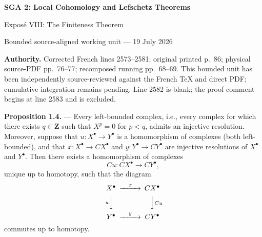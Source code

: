 \documentclass[10pt,a4paper]{article}
\newcommand{\ZZ}{\mathbf Z}
\begin{document}
\begin{center}
  {\Large\bfseries SGA 2: Local Cohomology and Lefschetz Theorems}\par\smallskip
  {\large Expos\'e VIII: The Finiteness Theorem}\par
  \small Bounded source-aligned working unit --- 19 July 2026
\end{center}
\noindent\colorbox{softgray}{\parbox{0.95\linewidth}{\footnotesize\textbf{Authority.}
Corrected French lines 2573--2581; original printed p.~86; physical
source-PDF pp.~76--77; recomposed running pp.~68--69. This bounded unit has
been independently source-reviewed against the French TeX and direct PDF;
cumulative integration remains pending. Line 2582 is blank; the proof comment
begins at line 2583 and is excluded.}}

\noindent\textbf{Proposition 1.4.} --- Every left-bounded complex, i.e., every
complex for which there exists $q\in\ZZ$ such that $X^p=0$ for $p<q$, admits
an injective resolution. Moreover, suppose that
$u\colon X^\bullet\longrightarrow Y^\bullet$ is a homomorphism of complexes
(both left-bounded), and that
$x\colon X^\bullet\longrightarrow CX^\bullet$ and
$y\colon Y^\bullet\longrightarrow CY^\bullet$ are injective resolutions of
$X^\bullet$ and $Y^\bullet$. Then there exists a homomorphism of complexes
\[
  Cu\colon CX^\bullet\longrightarrow CY^\bullet,
\]
unique up to homotopy, such that the diagram
\[
\begin{CD}
X^\bullet @>{x}>> CX^\bullet \\
@V{u}VV @VV{Cu}V \\
Y^\bullet @>{y}>> CY^\bullet
\end{CD}
\]
commutes up to homotopy.
\end{document}
